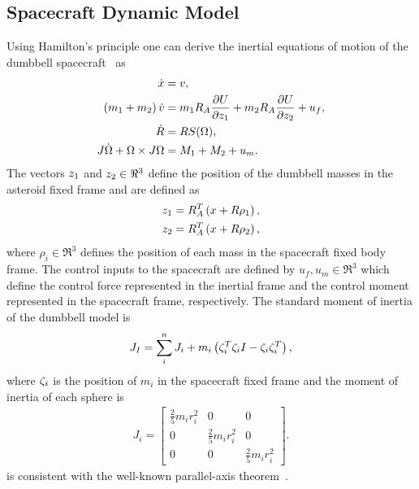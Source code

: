 \documentclass[journal]{new-aiaa}
\begin{document}
\subsection{Spacecraft Dynamic Model}

Using Hamilton's principle one can derive the inertial equations of motion of the dumbbell spacecraft~\cite{kulumani2017b} as
\begin{align}
    \dot{x} &= v, \label{eq:x_dot}\\
    \left( m_1 + m_2 \right) \dot{v} &= m_1 R_A \frac{\partial U}{\partial z_1} + m_2 R_A \frac{\partial U}{\partial z_2} + u_f,\label{eq:v_dot} \\
    \dot{R} &= R S(\Omega) , \label{eq:R_dot}\\
    J \dot{\Omega} + \Omega \times J \Omega &= M_1 + M_2 + u_m. \label{eq:omega_dot}
\end{align}
The vectors \( z_1 \) and \( z_2\in\Re^3\) define the position of the dumbbell masses in the asteroid fixed frame and are defined as
\begin{align}
    z_1 &= R_A^T \left( x + R \rho_1 \right) , \\
    z_2 &= R_A^T \left( x + R \rho_2 \right),
\end{align}
where \( \rho_i \in\Re^3 \) defines the position of each mass in the spacecraft fixed body frame.
The control inputs to the spacecraft are defined by \( u_f, u_m \in \Re^3 \) which define the control force represented in the inertial frame and the control moment represented in the spacecraft frame, respectively.
The standard moment of inertia of the dumbbell model is 
\begin{align}\label{eq:dumbbell_moment_of_inertia}
    J_I = \sum_i^n J_i + m_i \left( \zeta_i^T \zeta_i I - \zeta_i \zeta_i^T \right) , 
\end{align}
where \( \zeta_i \) is the position of \( m_i \) in the spacecraft fixed frame and the moment of inertia of each sphere is
\begin{align}\label{eq:sphere_moment_of_inertia}
    J_i = \begin{bmatrix} 
        \frac{2}{5} m_i r_i^2 & 0 & 0 \\
        0 & \frac{2}{5} m_i r_i^2 & 0 \\
        0 & 0 & \frac{2}{5} m_i r_i^2 
    \end{bmatrix}.
\end{align}
 is consistent with the well-known parallel-axis theorem~\cite{greenwood1988}.
\end{document}
